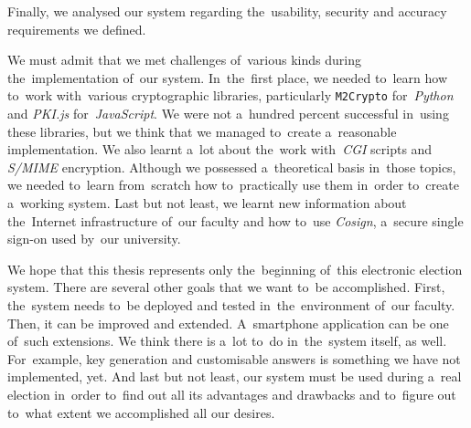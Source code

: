 Finally, we analysed our system regarding the~usability, security and accuracy requirements we defined.

We must admit that we met challenges of~various kinds during the~implementation of~our system. In~the~first place, we needed to~learn how to~work with~various cryptographic libraries, particularly \texttt{M2Crypto} for~\emph{Python} and \emph{PKI.js} for~\emph{JavaScript}. We were not a~hundred percent successful in~using these libraries, but we think that we managed to~create a~reasonable implementation. We also learnt a~lot about the~work with~\emph{CGI} scripts and \emph{S/MIME} encryption. Although we possessed a~theoretical basis in~those topics, we needed to~learn from~scratch how to~practically use them in~order to~create a~working system. Last but not least, we learnt new information about the~Internet infrastructure of~our faculty and how to~use \emph{Cosign}, a~secure single sign-on used by~our university.

We hope that this thesis represents only the~beginning of~this electronic election system. There are several other goals that we want to~be accomplished. First, the~system needs to~be deployed and tested in~the~environment of~our faculty. Then, it can be improved and extended. A~smartphone application can be one of~such extensions. We think there is a~lot to~do in~the~system itself, as well. For~example, key generation and customisable answers is something we have not implemented, yet. And last but not least, our system must be used during a~real election in~order to~find out all its advantages and drawbacks and to~figure out to~what extent we accomplished all our desires.